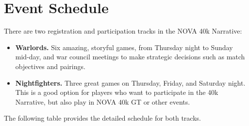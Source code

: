 \chapter{Event Schedule}

There are two registration and participation tracks in the NOVA 40k Narrative:
\begin{itemize}
\item \textbf{Warlords.} Six amazing, storyful games, from Thursday
  night to Sunday mid-day, and war council meetings to make strategic
  decisions such as match objectives and pairings.

\item \textbf{Nightfighters.} Three great games on Thursday, Friday,
  and Saturday night.  This is a good option for players who want to
  participate in the 40k Narrative, but also play in NOVA 40k GT or
  other events.
\end{itemize}

The following table provides the detailed schedule for both tracks.

